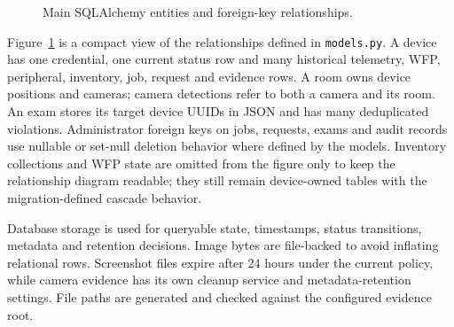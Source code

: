 \documentclass[12pt,a4paper]{report}
\begin{document}
\begin{figure}[H]
\centering
{}
\caption{Main SQLAlchemy entities and foreign-key relationships.}
\label{fig:entity-relationships}
\end{figure}

Figure~\ref{fig:entity-relationships} is a compact view of the relationships
defined in \texttt{models.py}. A device has one credential, one current status
row and many historical telemetry, WFP, peripheral, inventory, job, request
and evidence rows. A room owns device positions and cameras; camera detections
refer to both a camera and its room. An exam stores its target device UUIDs in
JSON and has many deduplicated violations. Administrator foreign keys on jobs,
requests, exams and audit records use nullable or set-null deletion behavior
where defined by the models. Inventory collections and WFP state are omitted
from the figure only to keep the relationship diagram readable; they still
remain device-owned tables with the migration-defined cascade behavior.

Database storage is used for queryable state, timestamps, status transitions,
metadata and retention decisions. Image bytes are file-backed to avoid
inflating relational rows. Screenshot files expire after 24 hours under the
current policy, while camera evidence has its own cleanup service and
metadata-retention settings. File paths are generated and checked against the
configured evidence root.
\end{document}

